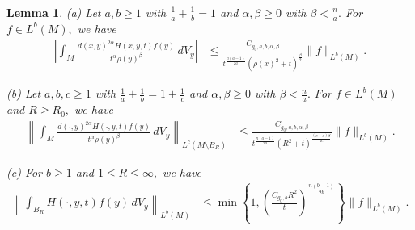 \documentclass[12pt]{amsart}
\renewcommand{\1}{{\mathbf 1}}
\newtheorem{lemma}[thm]{Lemma}
\theoremstyle{others}
\numberwithin{equation}{section}
\begin{document}
\begin{lemma}\label{lemma:youngsconvolution} 
(a) Let $a,b \geq 1$ with $\frac{1}{a} + \frac{1}{b} = 1$ and $\alpha, \beta \ge 0$ with $\beta < \frac{n}{a}.$ For $f \in L^b(M),$ we have
\begin{equation*}%
       \begin{split}
        \left| \int_M \frac{d(x, y)^{2 \alpha} H(x,y,t) f(y) }{t^\alpha \rho(y)^\beta} \, dV_y \right| & \leq \frac{C_{g_0,a,b, \alpha, \beta} }{t^{\frac{n(a - 1)}{2a} } \left(\rho(x)^2 + t \right)^{\frac{\beta}{2}} } \| f \|_{L^b(M)}.
        \end{split}
        \end{equation*}

        \vspace{2mm}
        
\noindent (b) Let $a,b,c \geq 1$ with $\frac{1}{a} + \frac{1}{b} = 1 + \frac{1}{c}$ and $\alpha, \beta \ge 0$ with $\beta < \frac{n}{a}.$ For $f \in L^b(M)$ and $R \geq R_0,$ we have
\begin{equation*}%
       \begin{split}
        \left\| \int_M \frac{d(\cdot, y)^{2 \alpha} H(\cdot,y,t) f(y) }{t^\alpha \rho(y)^\beta} \, dV_y \right\|_{L^c(M \setminus B_R)} & \leq \frac{C_{g_0,a,b, \alpha, \beta} }{t^{\frac{n(a - 1)}{2a} } \left(R^2 + t \right)^{\frac{(c - a)\beta}{2c}} } \| f \|_{L^b(M)}.
        \end{split}
        \end{equation*}

        \vspace{2mm}

\noindent (c) For $b \geq 1$ and $1 \leq R \leq \infty,$ we have
\begin{equation*}%
       \begin{split}
        \left\| \int_{B_R} H(\cdot,y,t) f(y) \, dV_y \right\|_{L^b(M)} & \leq \min \left\{ 1, \left( \frac{C_{g_0,b} R^2 }{t} \right)^{\frac{n(b - 1)}{2b}} \right\} \| f \|_{L^b(M)}.
        \end{split}
        \end{equation*}
\end{lemma}
\end{document}
